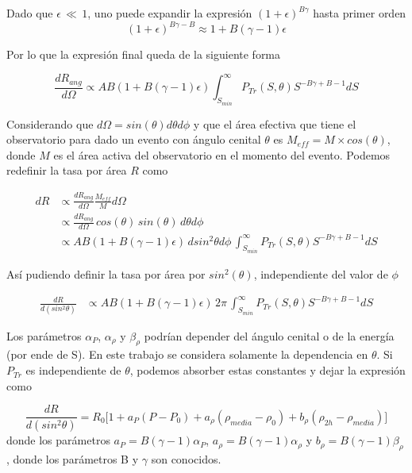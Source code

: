 Dado que $\epsilon\,\ll\,1$, uno puede expandir la expresión $(1+\epsilon)^{B\gamma}$ hasta primer orden 
\begin{equation*}
	(1+\epsilon)^{B\gamma-B} \approx 1 + B(\gamma-1)\epsilon
\end{equation*}

Por lo que la expresión final queda de la siguiente forma

\begin{equation*}
	\frac{dR_{ang}}{d\Omega} \propto AB(1+B(\gamma - 1)\epsilon)\int_{S_{min}}^{\infty} P_{Tr}(S,\theta) S^{-B\gamma +B -1} dS
\end{equation*}

Considerando que $d\Omega= sin(\theta)d\theta d\phi$ y que el área efectiva  que tiene el observatorio para dado un evento con ángulo cenital $\theta$ es $M_{eff}=M\times cos(\theta)$, donde $M$ es el área activa del observatorio en el momento del evento. Podemos redefinir la tasa por área $R$ como

\begin{align*}
	dR 	&\propto \frac{dR_{ang}}{d\Omega} \frac{M_{eff}}{M} d\Omega \\
		&\propto \frac{dR_{ang}}{d\Omega}\, cos(\theta)\, sin(\theta)\,d\theta d\phi\\
		&\propto  AB(1+B(\gamma - 1)\epsilon)\,dsin^2\theta d\phi\,\int_{S_{min}}^{\infty} P_{Tr}(S,\theta) S^{-B\gamma +B -1} dS
\end{align*}

Así pudiendo definir la tasa por área por $sin^2(\theta)$, independiente del valor de $\phi$

\begin{align*}
	\frac{dR}{d(sin^2\theta)} &\propto AB(1+B(\gamma-1)\epsilon)\, 2\pi \,\int_{S_{min}}^{\infty} P_{Tr}(S,\theta) S^{-B\gamma +B -1} dS
\end{align*}

Los parámetros $\alpha_P$, $\alpha_{\rho}$ y $\beta_{\rho}$ podrían depender del ángulo cenital o de la energía (por ende de S). En este trabajo se considera solamente la dependencia en $\theta$. Si $P_{Tr}$ es independiente de $\theta$, podemos absorber estas constantes y dejar la expresión como

\begin{equation}
	\frac{dR}{d(sin^2\theta)} = R_0\bigg[1+a_P(P-P_0) +a_{\rho}(\rho_{media}-\rho_0) + b_{\rho}(\rho_{2h}-\rho_{media})\bigg] 
	\label{eq:rate_sin2}
\end{equation}
donde los parámetros $a_P=B(\gamma-1)\alpha_{P}$, $a_{\rho}=B(\gamma-1)\alpha_{\rho}$ y $b_{\rho}=B(\gamma-1)\beta_{\rho}$, donde los parámetros B y $\gamma$ son conocidos.

